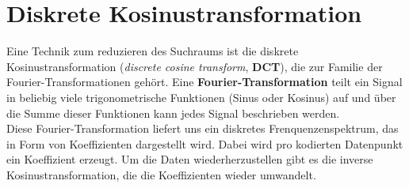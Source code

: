 \newpage

    \section{Diskrete Kosinustransformation} \label{dct-definition}

        Eine Technik zum reduzieren des Suchraums ist die diskrete Kosinustransformation (\textit{discrete cosine transform}, \textbf{DCT}), die zur Familie der Fourier-Transformationen gehört. Eine \textbf{Fourier-Transformation} teilt ein Signal in beliebig viele trigonometrische Funktionen (Sinus oder Kosinus) auf und über die Summe dieser Funktionen kann jedes Signal beschrieben werden. \\

        \noindent
        Diese Fourier-Transformation liefert uns ein diskretes Frenquenzenspektrum, das in Form von Koeffizienten dargestellt wird. Dabei wird pro kodierten Datenpunkt ein Koeffizient erzeugt. Um die Daten wiederherzustellen gibt es die inverse Kosinustransformation, die die Koeffizienten wieder umwandelt.


